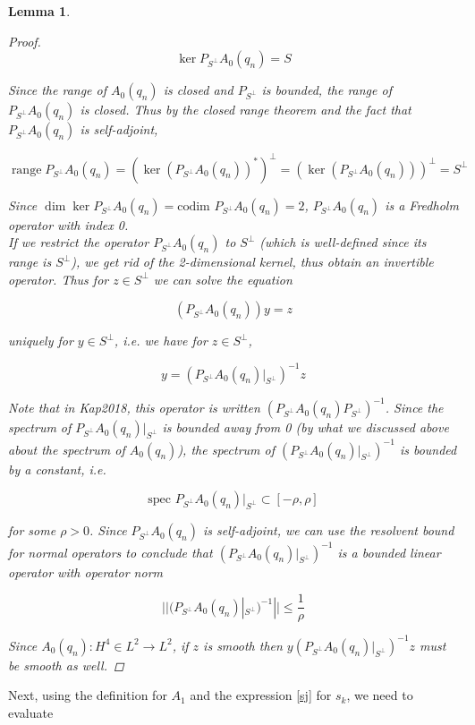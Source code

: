 \documentclass[12pt]{article}
\DeclareMathOperator{\ran}{range}
\newtheorem{lemma}{Lemma}
\begin{document}
\begin{lemma}
\begin{proof}
\[
\ker P_{S^\perp} A_0(q_n) = S 
\]

Since the range of $A_0(q_n)$ is closed and $P_{S^\perp}$ is bounded, the range of $P_{S^\perp} A_0(q_n)$ is closed. Thus by the closed range theorem and the fact that $P_{S^\perp} A_0(q_n)$ is self-adjoint,

\[
\ran P_{S^\perp} A_0(q_n) = (\ker (P_{S^\perp} A_0(q_n))^*)^\perp = (\ker (P_{S^\perp} A_0(q_n)))^\perp = S^\perp
\]

Since $\dim \ker P_{S^\perp} A_0(q_n) = \text{codim } P_{S^\perp} A_0(q_n) = 2$, $P_{S^\perp} A_0(q_n)$ is a Fredholm operator with index 0.\\

If we restrict the operator $P_{S^\perp} A_0(q_n)$ to $S^\perp$ (which is well-defined since its range is $S^\perp$), we get rid of the 2-dimensional kernel, thus obtain an invertible operator. Thus for $z \in S^\perp$ we can solve the equation

\[
(P_{S^\perp} A_0(q_n)) y = z
\]

uniquely for $y \in S^\perp$, i.e. we have for $z \in S^\perp$,

\begin{equation}
y = (P_{S^\perp} A_0(q_n) |_{S^\perp})^{-1} z
\end{equation}

Note that in Kap2018, this operator is written $(P_{S^\perp} A_0(q_n) P_{S^\perp})^{-1}$. Since the spectrum of $P_{S^\perp} A_0(q_n) |_{S^\perp}$ is bounded away from 0 (by what we discussed above about the spectrum of $A_0(q_n)$), the spectrum of $(P_{S^\perp} A_0(q_n) |_{S^\perp})^{-1}$ is bounded by a constant, i.e. 

\[
\text{spec } P_{S^\perp} A_0(q_n) |_{S^\perp}  \subset [-\rho, \rho]
\]

for some $\rho > 0$. Since $P_{S^\perp} A_0(q_n)$ is self-adjoint, we can use the resolvent bound for normal operators to conclude that $(P_{S^\perp} A_0(q_n) |_{S^\perp})^{-1}$ is a bounded linear operator with operator norm

\[
|| (P_{S^\perp} A_0(q_n)|_{S^\perp})^{-1} || \leq \frac{1}{\rho}
\]

Since $A_0(q_n): H^4 \in L^2 \rightarrow L^2$, if $z$ is smooth then $y (P_{S^\perp} A_0(q_n) |_{S^\perp})^{-1} z$ must be smooth as well.

\end{proof}
\end{lemma}

Next, using the definition for $A_1$ and the expression \eqref{sj} for $s_k$, we need to evaluate
\end{document}
